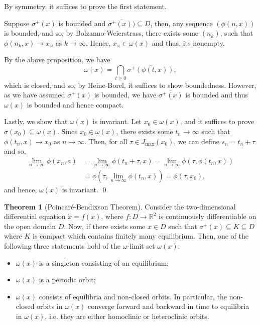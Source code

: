 \documentclass[
]{article}
\theoremstyle{definition}
\newtheorem{theorem}{Theorem}
\theoremstyle{definition}
\begin{document}
By symmetry, it suffices to prove the first statement.

Suppose \(\sigma^+(x)\) is bounded and
\(\overline{\sigma^+(x))} \subseteq D\), then, any sequence
\((\phi(n, x))\) is bounded, and so, by Bolzanno-Weierstrass, there
exists some \((n_k)\), such that \(\phi(n_k, x) \to x_\omega\) as
\(k \to \infty\). Hence, \(x_\omega \in \omega(x)\) and thus, its
nonempty.

By the above proposition, we have
\[\omega(x) = \bigcap_{t \ge 0} \overline{\sigma^+(\phi(t, x))},\] which
is closed, and so, by Heine-Borel, it suffices to show boundedness.
However, as we have assumed \(\sigma^+(x)\) is bounded, we have
\(\overline{\sigma^+(x)}\) is bounded and thus \(\omega(x)\) is bounded
and hence compact.

Lastly, we show that \(\omega(x)\) is invariant. Let
\(x_0 \in \omega(x)\), and it suffices to prove
\(\sigma(x_0) \subseteq \omega(x)\). Since \(x_0 \in  \omega(x)\), there
exists some \(t_n \to \infty\) such that \(\phi(t_n, x) \to x_0\) as
\(n \to \infty\). Then, for all \(\tau \in J_{\max}(x_0)\), we can
define \(s_n = t_n + \tau\) and so, \[\begin{split}
    \lim_{n \to \infty} \phi(x_n, a) & = \lim_{n \to \infty} \phi(t_n + \tau, x) = 
      \lim_{n \to \infty} \phi(\tau, \phi(t_n, x))\\
      & = \phi(\tau, \lim_{n \to \infty} \phi(t_n, x)) = \phi(\tau, x_0),
  \end{split}\] and hence, \(\omega(x)\) is invariant. \qed

\begin{theorem}[Poincaré-Bendixson Theorem]
  Consider the two-dimensional differential equation \(\dot x = f(x)\), where 
  \(f : D \to \mathbb{R}^2\) is continuously differentiable on the open domain \(D\). 
  Now, if there exists some \(x \in D\) such that \(\sigma^+(x) \subseteq K \subseteq D\) 
  where \(K\) is compact which contains finitely many equilibrium. Then, one of the following 
  three statements hold of the \(\omega\)-limit set \(\omega(x)\):
  \begin{itemize}
    \item \(\omega(x)\) is a singleton consisting of an equilibrium;
    \item \(\omega(x)\) is a periodic orbit;
    \item \(\omega(x)\) consists of equilibria and non-closed orbits. In particular, 
      the non-closed orbits in \(\omega(x)\) converge forward and backward in time 
      to equilibria in \(\omega(x)\), i.e. they are either homoclinic or heteroclinic 
      orbits.
  \end{itemize}
\end{theorem}
\proof
\end{document}
